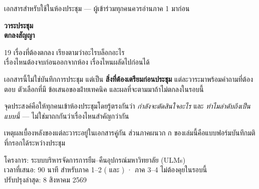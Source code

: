 \begin{titlepage}
\thispagestyle{empty}

\vspace*{1.4cm}
{\sansall\color{muted}\small เอกสารสำหรับใช้ในห้องประชุม --- ผู้เข้าร่วมทุกคนควรอ่านภาค 1 มาก่อน}

\vspace{0.9cm}
{\sansall\bfseries\fontsize{27}{33}\selectfont\color{ctr!90!black}
วาระประชุม\\ตกลงสัญญา \par}

\vspace{0.5cm}
{\sansall\fontsize{13.5}{19}\selectfont\color{ink}
19 เรื่องที่ต้องตกลง เรียงตามว่าอะไรบล็อกอะไร\\
เรื่องไหนต้องจบก่อนออกจากห้อง เรื่องไหนผลัดไปก่อนได้\par}

\vspace{2.8cm}

\begin{minipage}{0.66\textwidth}
เอกสารนี้ไม่ใช่บันทึกการประชุม แต่เป็น \textbf{สิ่งที่ต้องเตรียมก่อนประชุม}
แต่ละวาระมาพร้อมคำถามที่ต้องตอบ ตัวเลือกที่มี ข้อเสนอของฝ่ายเทคนิค
และผลที่จะตามมาถ้าไม่ตกลงในรอบนี้

\vspace{0.6em}
จุดประสงค์คือให้ทุกคนเข้าห้องประชุมโดยรู้ตรงกันว่า \emph{กำลังจะตัดสินใจอะไร}
และ \emph{ทำไมลำดับถึงเป็นแบบนี้} --- ไม่ใช่มาถกกันว่าเรื่องไหนสำคัญกว่ากัน

\vspace{0.6em}
เหตุผลเบื้องหลังของแต่ละวาระอยู่ในเอกสารคู่กัน 
ส่วนภาคผนวก ก ของเล่มนี้คือแบบฟอร์มบันทึกมติที่กรอกได้ระหว่างประชุม
\end{minipage}

\vfill
{}
\vspace{0.3em}

{\sansall\footnotesize\color{muted}
โครงการ: ระบบบริหารจัดการการยืม--คืนอุปกรณ์มหาวิทยาลัย (ULMs) \\
เวลาที่เสนอ: 90 นาที สำหรับภาค 1--2 (\pzero{} และ \pone{}) · ภาค 3--4 ไม่ต้องคุยในรอบนี้ \\
ปรับปรุงล่าสุด: 8 สิงหาคม 2569}
\end{titlepage}

